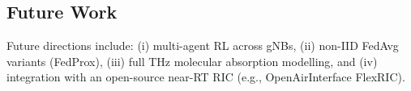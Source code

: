 \subsection{Future Work}
Future directions include: (i) multi-agent RL across gNBs, (ii) non-IID
FedAvg variants (FedProx), (iii) full THz molecular absorption modelling,
and (iv) integration with an open-source near-RT RIC (e.g., OpenAirInterface
FlexRIC).
